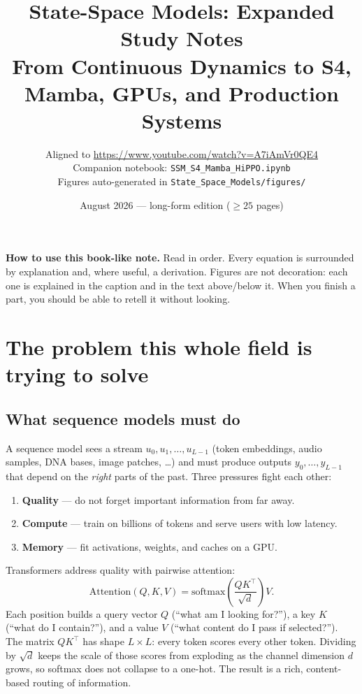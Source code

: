\documentclass[11pt,a4paper]{article}
\title{\textbf{State-Space Models: Expanded Study Notes}\\[0.4em]
\large From Continuous Dynamics to S4, Mamba, GPUs, and Production Systems}
\author{Aligned to \url{https://www.youtube.com/watch?v=A7iAmVr0QE4}\\[0.3em]
Companion notebook: \texttt{SSM\_S4\_Mamba\_HiPPO.ipynb}\\
Figures auto-generated in \texttt{State\_Space\_Models/figures/}}
\date{August 2026 --- long-form edition ($\ge 25$ pages)}
\begin{document}
\maketitle

\begin{notebox}
\textbf{How to use this book-like note.}
Read in order. Every equation is surrounded by explanation and, where useful, a derivation.
Figures are not decoration: each one is explained in the caption and in the text above/below it.
When you finish a part, you should be able to retell it without looking.
\end{notebox}

\tableofcontents
\newpage

\section{The problem this whole field is trying to solve}

\subsection{What sequence models must do}
A sequence model sees a stream $u_0,u_1,\ldots,u_{L-1}$ (token embeddings, audio samples, DNA bases, image patches, \ldots) and must produce outputs $y_0,\ldots,y_{L-1}$ that depend on the \emph{right} parts of the past.
Three pressures fight each other:
\begin{enumerate}[leftmargin=*]
  \item \textbf{Quality} --- do not forget important information from far away.
  \item \textbf{Compute} --- train on billions of tokens and serve users with low latency.
  \item \textbf{Memory} --- fit activations, weights, and caches on a GPU.
\end{enumerate}

Transformers address quality with pairwise attention:
\begin{equation}
\mathrm{Attention}(Q,K,V)
=\mathrm{softmax}\!\left(\frac{QK^\top}{\sqrt{d}}\right)V.
\label{eq:attn}
\end{equation}
Each position builds a query vector $Q$ (``what am I looking for?''), a key $K$ (``what do I contain?''), and a value $V$ (``what content do I pass if selected?'').
The matrix $QK^\top$ has shape $L\times L$: every token scores every other token.
Dividing by $\sqrt{d}$ keeps the scale of those scores from exploding as the channel dimension $d$ grows, so softmax does not collapse to a one-hot.
The result is a rich, content-based routing of information.
\end{document}
